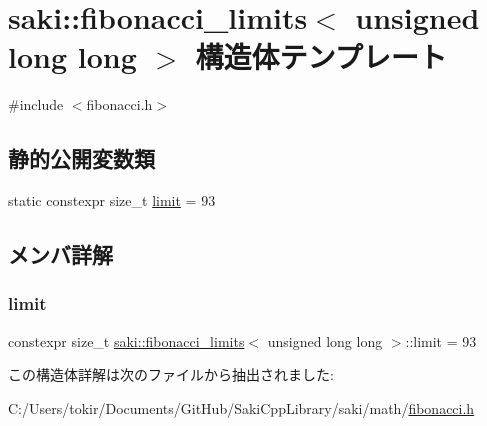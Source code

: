 \hypertarget{structsaki_1_1fibonacci__limits_3_01unsigned_01long_01long_01_4}{}\section{saki\+:\+:fibonacci\+\_\+limits$<$ unsigned long long $>$ 構造体テンプレート}
\label{structsaki_1_1fibonacci__limits_3_01unsigned_01long_01long_01_4}


{\ttfamily \#include $<$fibonacci.\+h$>$}

\subsection*{静的公開変数類}
\begin{DoxyCompactItemize}
\item 
static constexpr size\+\_\+t \mbox{\hyperlink{structsaki_1_1fibonacci__limits_3_01unsigned_01long_01long_01_4_a545c9d82d0d2327f0d3e8299953e5492}{limit}} = 93
\end{DoxyCompactItemize}


\subsection{メンバ詳解}
\mbox{\label{structsaki_1_1fibonacci__limits_3_01unsigned_01long_01long_01_4_a545c9d82d0d2327f0d3e8299953e5492}} 
\subsubsection{\texorpdfstring{limit}{limit}}
{\footnotesize\ttfamily constexpr size\+\_\+t \mbox{\hyperlink{structsaki_1_1fibonacci__limits}{saki\+::fibonacci\+\_\+limits}}$<$ unsigned long long $>$\+::limit = 93\hspace{0.3cm}{\ttfamily [static]}}



この構造体詳解は次のファイルから抽出されました\+:\begin{DoxyCompactItemize}
\item 
C\+:/\+Users/tokir/\+Documents/\+Git\+Hub/\+Saki\+Cpp\+Library/saki/math/\mbox{\hyperlink{fibonacci_8h}{fibonacci.\+h}}\end{DoxyCompactItemize}
